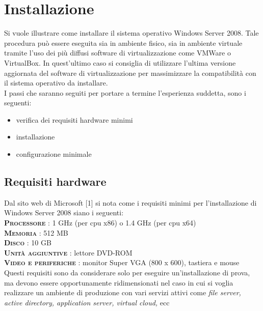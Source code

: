 
\chapter{Installazione}
Si vuole illustrare come installare il sistema operativo Windows Server 2008.
Tale procedura può essere eseguita sia in ambiente fisico, sia in ambiente virtuale
tramite l’uso dei più diffusi software di virtualizzazione come VMWare
o VirtualBox. In quest’ultimo caso si consiglia di utilizzare l’ultima versione
aggiornata del software di virtualizzazione per massimizzare la compatibilità
con il sistema operativo da installare.\\ \indent
I passi che saranno seguiti per portare a termine l’esperienza suddetta,
sono i seguenti:

\begin{itemize}
\item verifica dei requisiti hardware minimi
\item installazione
\item configurazione minimale
\end{itemize}

\section{Requisiti hardware}
Dal sito web di Microsoft [1] si nota come i requisiti minimi per l’installazione
di Windows Server 2008 siano i seguenti:
\\ {\scshape \bfseries Processore} : 1 GHz (per cpu x86) o 1.4 GHz (per cpu x64)
\\ {\scshape \bfseries Memoria} : 512 MB
\\ {\scshape \bfseries Disco} : 10 GB
\\ {\scshape \bfseries Unità aggiuntive} : lettore DVD-ROM
\\ {\scshape \bfseries Video e periferiche} : monitor Super VGA (800 x 600), tastiera e mouse
\\ Questi requisiti sono da considerare solo per eseguire un’installazione di prova,
ma devono essere opportunamente ridimensionati nel caso in cui si voglia
realizzare un ambiente di produzione con vari servizi attivi come { \itshape file server,
active directory, application server, virtual cloud, } ecc

